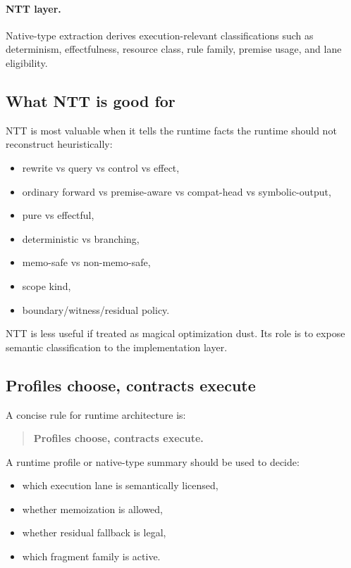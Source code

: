 \documentclass[11pt]{article}
\begin{document}
\paragraph{NTT layer.}
Native-type extraction derives execution-relevant classifications such as determinism, effectfulness, resource class, rule family, premise usage, and lane eligibility.

\subsection{What NTT is good for}

NTT is most valuable when it tells the runtime facts the runtime should not reconstruct heuristically:
\begin{itemize}[leftmargin=2em]
  \item rewrite vs query vs control vs effect,
  \item ordinary forward vs premise-aware vs compat-head vs symbolic-output,
  \item pure vs effectful,
  \item deterministic vs branching,
  \item memo-safe vs non-memo-safe,
  \item scope kind,
  \item boundary/witness/residual policy.
\end{itemize}

NTT is less useful if treated as magical optimization dust. Its role is to expose semantic classification to the implementation layer.

\subsection{Profiles choose, contracts execute}

A concise rule for runtime architecture is:
\begin{quote}
\textbf{Profiles choose, contracts execute.}
\end{quote}

A runtime profile or native-type summary should be used to decide:
\begin{itemize}[leftmargin=2em]
  \item which execution lane is semantically licensed,
  \item whether memoization is allowed,
  \item whether residual fallback is legal,
  \item which fragment family is active.
\end{itemize}
\end{document}
